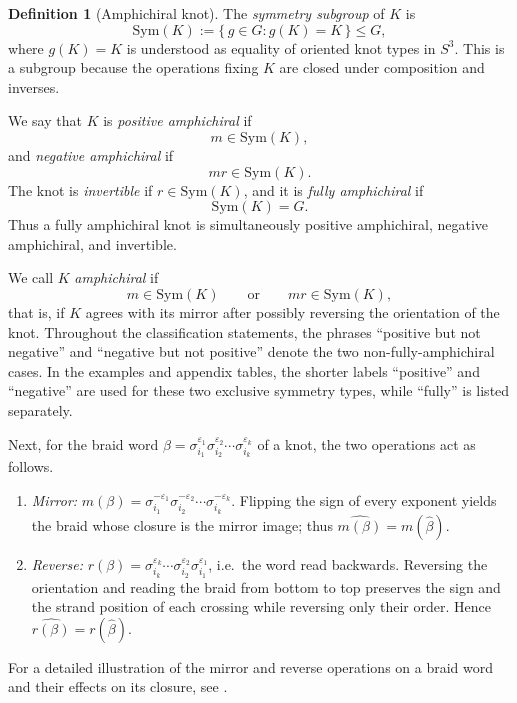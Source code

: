 \documentclass[11pt]{article}
\theoremstyle{definition}
\newtheorem{definition}[definition]{Definition}
\begin{document}
\begin{definition}[Amphichiral knot]
\smallskip
\noindent
The \emph{symmetry subgroup} of $K$ is
\[
\mathrm{Sym}(K)
:=
\{\,g\in G:g(K)=K\,\}
\le G,
\]
where $g(K)=K$ is understood as equality of oriented knot types in
$S^3$. This is a subgroup because the operations fixing $K$ are closed
under composition and inverses.

We say that $K$ is \emph{positive amphichiral} if
\[
m\in\mathrm{Sym}(K),
\]
and \emph{negative amphichiral} if
\[
mr\in\mathrm{Sym}(K).
\]
The knot is \emph{invertible} if $r\in\mathrm{Sym}(K)$, and it is
\emph{fully amphichiral} if
\[
\mathrm{Sym}(K)=G.
\]
Thus a fully amphichiral knot is simultaneously positive amphichiral,
negative amphichiral, and invertible.

We call $K$ \emph{amphichiral} if
\[
m\in\mathrm{Sym}(K)
\qquad\text{or}\qquad
mr\in\mathrm{Sym}(K),
\]
that is, if $K$ agrees with its mirror after possibly reversing the
orientation of the knot. Throughout the classification statements,
the phrases ``positive but not negative'' and ``negative but not
positive'' denote the two non-fully-amphichiral cases. In the examples
and appendix tables, the shorter labels ``positive'' and ``negative''
are used for these two exclusive symmetry types, while ``fully'' is
listed separately.
\end{definition}

\noindent Next, for the braid word
$\beta=\sigma_{i_1}^{\varepsilon_1}\sigma_{i_2}^{\varepsilon_2}\cdots
\sigma_{i_k}^{\varepsilon_k}$ of a knot, the two operations act as follows.
\begin{enumerate}[label=\textup{(\alph*)}]
\item \emph{Mirror:} $m(\beta)=\sigma_{i_1}^{-\varepsilon_1}
\sigma_{i_2}^{-\varepsilon_2}\cdots\sigma_{i_k}^{-\varepsilon_k}$. Flipping the sign of
every exponent yields the braid whose closure is the mirror image; thus
$\widehat{m(\beta)}=m(\widehat{\beta})$.
\item \emph{Reverse:} $r(\beta)=\sigma_{i_k}^{\varepsilon_k}\cdots
\sigma_{i_2}^{\varepsilon_2}\sigma_{i_1}^{\varepsilon_1}$, i.e.\ the word read backwards.
Reversing the orientation and reading the braid from bottom to top preserves the
sign and the strand position of each crossing while reversing only their order.
Hence $\widehat{r(\beta)}=r(\widehat{\beta})$.
\end{enumerate}

For a detailed illustration of the mirror and reverse operations on a braid word and their effects on its closure, see .
\end{document}

